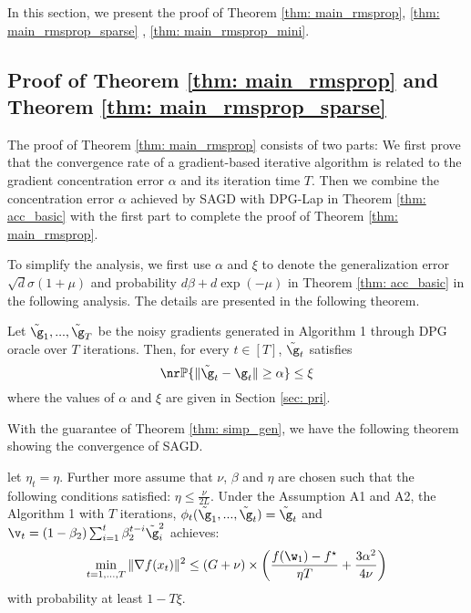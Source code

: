 
In this section, we present the proof of Theorem \ref{thm: main_rmsprop}, \ref{thm: main_rmsprop_sparse}
\label{sec: thm2_proof}, \ref{thm: main_rmsprop_mini}.

\subsection{Proof of Theorem \ref{thm: main_rmsprop} and Theorem \ref{thm: main_rmsprop_sparse}}

\theomainrmsprop*


The proof of Theorem \ref{thm: main_rmsprop} consists of two parts: We first prove that the convergence rate of a gradient-based iterative algorithm is related to the gradient concentration error $\alpha$ and its iteration 
time $T$. Then we combine the concentration error $\alpha$ achieved by SAGD with DPG-Lap in Theorem \ref{thm: acc_basic} with the first part to complete the proof of Theorem \ref{thm: main_rmsprop}. 


To simplify the analysis, we first use
$\alpha$ and $\xi$ to denote the generalization error $\sqrt{d} \sigma(1+\mu)$ and probability $d \beta+d \exp (-\mu)$ in Theorem \ref{thm: acc_basic} in the following analysis. The details are presented in the following theorem.



\begin{theo} \label{thm: simp_gen}
Let $\tilde \g_1,...,\tilde \g_T$ be the noisy gradients generated in Algorithm 1 through DPG oracle over $T$ iterations.
Then, for every $t \in [T]$, $\tilde \g_t$ satisfies
\begin{equation} \nr
    \mathbb{P}\{\|\tilde \g_t - \g_t\| \geq \alpha \} \leq \xi
\end{equation}
where the values of $\alpha$ and $\xi$ are given in Section \ref{sec: pri}. 
\end{theo}


With the guarantee of Theorem \ref{thm: simp_gen}, we have the following theorem showing the convergence of SAGD.



\begin{theo} \label{thm: opt_rmsprop}
 let $\eta_t = \eta$. Further more assume that $\nu$, $\beta$ and $\eta$ are chosen such that the following conditions satisfied: $\eta \leq \frac{\nu}{2L}$. 
 Under the Assumption A1 and A2, the Algorithm 1 with $T$ iterations, $\phi_t(\tilde \g_1,...,\tilde \g_t) = \tilde \g_t$ and $ \v_t = \left(1-\beta_{2}\right) \sum_{i=1}^{t} \beta_{2}^{t-i} \tilde \g_{i}^{2}$ achieves:
\begin{equation}\label{eq: opt_rmsprop}
 \min_{t = 1,..., T}\|\nabla f(x_t)\|^2 \leq
    \left(G+\nu \right) \times \left(   \frac{ f(\w_1) - f^\star}{\eta T} + \frac{3 \alpha^2}{4\nu}\right)
\end{equation}
with probability at least $1-T\xi$.
\end{theo}




